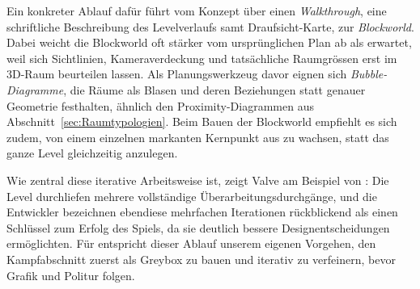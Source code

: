 \documentclass[../Main.tex]{subfiles}
\begin{document}
Ein konkreter Ablauf dafür führt vom Konzept über einen \textit{Walkthrough}, eine schriftliche Beschreibung des Levelverlaufs samt Draufsicht-Karte, zur \textit{Blockworld}. Dabei weicht die Blockworld oft stärker vom ursprünglichen Plan ab als erwartet, weil sich Sichtlinien, Kameraverdeckung und tatsächliche Raumgrössen erst im 3D-Raum beurteilen lassen. Als Planungswerkzeug davor eignen sich \textit{Bubble-Diagramme}, die Räume als Blasen und deren Beziehungen statt genauer Geometrie festhalten, ähnlich den Proximity-Diagrammen aus Abschnitt~\ref{sec:Raumtypologien}. Beim Bauen der Blockworld empfiehlt es sich zudem, von einem einzelnen markanten Kernpunkt aus zu wachsen, statt das ganze Level gleichzeitig anzulegen.\autocite{gdc_leveldesignaday2020}

Wie zentral diese iterative Arbeitsweise ist, zeigt Valve am Beispiel von : Die Level durchliefen mehrere vollständige Überarbeitungsdurchgänge, und die Entwickler bezeichnen ebendiese mehrfachen Iterationen rückblickend als einen Schlüssel zum Erfolg des Spiels, da sie deutlich bessere Designentscheidungen ermöglichten.\autocite{jacobson2005postmortem} Für  entspricht dieser Ablauf unserem eigenen Vorgehen, den Kampfabschnitt zuerst als Greybox zu bauen und iterativ zu verfeinern, bevor Grafik und Politur folgen.
\end{document}
